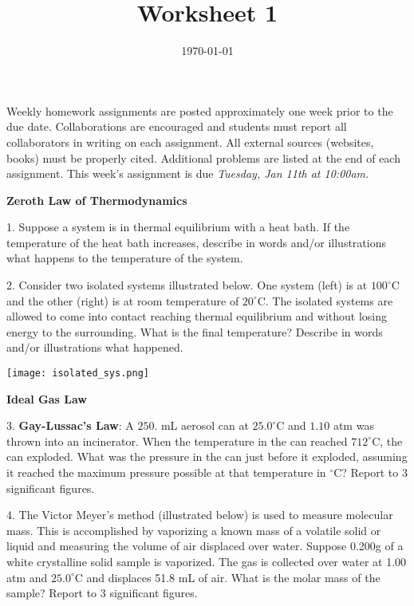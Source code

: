 \documentclass[11pt]{article}
\title{\textbf{Worksheet 1}}
\date{\vspace{-2em}\today}
\begin{document}
\maketitle

Weekly homework assignments are posted approximately one week prior to the
due date. Collaborations are encouraged and students must report all collaborators
in writing on each assignment. All external sources (websites, books) must be
properly cited. Additional problems are listed at the end of each assignment.
This week's assignment is due \textit{Tuesday, Jan 11th at 10:00am.}

\textbf{Zeroth Law of Thermodynamics}

1. Suppose a system is in thermal equilibrium with a heat bath. If the temperature
of the heat bath increases, describe in words and/or illustrations what happens to
the temperature of the system.


\vspace{2in}

2. Consider two isolated systems illustrated below. One system (left) is at $100^\circ\text{C}$
and the other (right) is at room temperature of $20^\circ\text{C}$. The isolated systems are allowed
to come into contact reaching thermal equilibrium and without losing energy to the surrounding.
What is the final temperature? Describe in words and/or illustrations what happened.

\begin{center}
  \texttt{[image: isolated\_sys.png]}
\end{center}

\vspace{2.5in}

\textbf{Ideal Gas Law}

3. \textbf{Gay-Lussac's Law}: A $250.$ mL aerosol can at $25.0^\circ\text{C}$ and $1.10$ atm was
thrown into an incinerator. When the temperature in the can reached $712^\circ\text{C}$, the
can exploded. What was the pressure in the can just before it exploded, assuming it reached
the maximum pressure possible at that temperature in $^\circ\text{C}$? Report to 3 significant figures.

\vspace{2.5in}

4. The Victor Meyer's method (illustrated below) is used to measure molecular mass. This
is accomplished by vaporizing a known mass of a volatile solid or liquid and measuring
the volume of air displaced over water. Suppose 0.200g of a white crystalline solid sample is
vaporized. The gas is collected over water at 1.00 atm and $25.0^\circ\text{C}$ and displaces
51.8 mL of air. What is the molar mass of the sample? Report to 3 significant figures.
\end{document}
